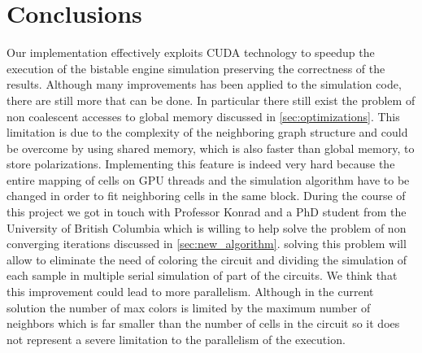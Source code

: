 \chapter{Conclusions}\label{sec:conclusions}
Our implementation effectively exploits CUDA technology to speedup the execution of the bistable engine simulation preserving the correctness of the results.
Although many improvements has been applied to the simulation code, there are still more that can be done. In particular there still exist the problem of non coalescent accesses to global memory discussed in \ref{sec:optimizations}. This limitation is due to the complexity of the neighboring graph structure and could be overcome by using shared memory, which is also faster than global memory, to store polarizations. Implementing this feature is indeed very hard because the entire mapping of cells on GPU threads and the simulation algorithm have to be changed in order to fit neighboring cells in the same block.\newline
During the course of this project we got in touch with Professor Konrad and a PhD student from the University of British Columbia which is willing to help solve the problem of non converging iterations discussed in \ref{sec:new_algorithm}. solving this problem will allow to eliminate the need of coloring the circuit and dividing the simulation of each sample in multiple serial simulation of part of the circuits. We think that this improvement could lead to more parallelism. Although in the current solution the number of max colors is limited by the maximum number of neighbors which is far smaller than the number of cells in the circuit so it does not represent a severe limitation to the parallelism of the execution.